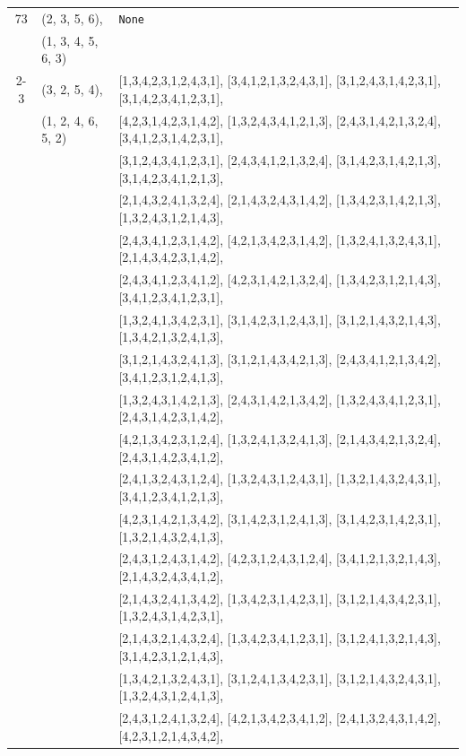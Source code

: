 \documentclass[10pt]{amsart}
\numberwithin{equation}{section}
\theoremstyle{plain}
\theoremstyle{definition}
\theoremstyle{remark}
\begin{document}
{\begin{longtable}{c|l|l}
		73 & (2, 3, 5, 6), & \texttt{None} \\
		& (1, 3, 4, 5, 6, 3) &  \\ \cline{2-3}
		
		& (3, 2, 5, 4), & [1,3,4,2,3,1,2,4,3,1], [3,4,1,2,1,3,2,4,3,1], [3,1,2,4,3,1,4,2,3,1], [3,1,4,2,3,4,1,2,3,1], \\
		& (1, 2, 4, 6, 5, 2) & [4,2,3,1,4,2,3,1,4,2], [1,3,2,4,3,4,1,2,1,3], [2,4,3,1,4,2,1,3,2,4], [3,4,1,2,3,1,4,2,3,1], \\
		&  & [3,1,2,4,3,4,1,2,3,1], [2,4,3,4,1,2,1,3,2,4], [3,1,4,2,3,1,4,2,1,3], [3,1,4,2,3,4,1,2,1,3], \\
		&  & [2,1,4,3,2,4,1,3,2,4], [2,1,4,3,2,4,3,1,4,2], [1,3,4,2,3,1,4,2,1,3], [1,3,2,4,3,1,2,1,4,3], \\
		&  & [2,4,3,4,1,2,3,1,4,2], [4,2,1,3,4,2,3,1,4,2], [1,3,2,4,1,3,2,4,3,1], [2,1,4,3,4,2,3,1,4,2], \\
		&  & [2,4,3,4,1,2,3,4,1,2], [4,2,3,1,4,2,1,3,2,4], [1,3,4,2,3,1,2,1,4,3], [3,4,1,2,3,4,1,2,3,1], \\
		&  & [1,3,2,4,1,3,4,2,3,1], [3,1,4,2,3,1,2,4,3,1], [3,1,2,1,4,3,2,1,4,3], [1,3,4,2,1,3,2,4,1,3], \\
		&  & [3,1,2,1,4,3,2,4,1,3], [3,1,2,1,4,3,4,2,1,3], [2,4,3,4,1,2,1,3,4,2], [3,4,1,2,3,1,2,4,1,3], \\
		&  & [1,3,2,4,3,1,4,2,1,3], [2,4,3,1,4,2,1,3,4,2], [1,3,2,4,3,4,1,2,3,1], [2,4,3,1,4,2,3,1,4,2], \\
		&  & [4,2,1,3,4,2,3,1,2,4], [1,3,2,4,1,3,2,4,1,3], [2,1,4,3,4,2,1,3,2,4], [2,4,3,1,4,2,3,4,1,2], \\
		&  & [2,4,1,3,2,4,3,1,2,4], [1,3,2,4,3,1,2,4,3,1], [1,3,2,1,4,3,2,4,3,1], [3,4,1,2,3,4,1,2,1,3], \\
		&  & [4,2,3,1,4,2,1,3,4,2], [3,1,4,2,3,1,2,4,1,3], [3,1,4,2,3,1,4,2,3,1], [1,3,2,1,4,3,2,4,1,3], \\
		&  & [2,4,3,1,2,4,3,1,4,2], [4,2,3,1,2,4,3,1,2,4], [3,4,1,2,1,3,2,1,4,3], [2,1,4,3,2,4,3,4,1,2], \\
		&  & [2,1,4,3,2,4,1,3,4,2], [1,3,4,2,3,1,4,2,3,1], [3,1,2,1,4,3,4,2,3,1], [1,3,2,4,3,1,4,2,3,1], \\
		&  & [2,1,4,3,2,1,4,3,2,4], [1,3,4,2,3,4,1,2,3,1], [3,1,2,4,1,3,2,1,4,3], [3,1,4,2,3,1,2,1,4,3], \\
		&  & [1,3,4,2,1,3,2,4,3,1], [3,1,2,4,1,3,4,2,3,1], [3,1,2,1,4,3,2,4,3,1], [1,3,2,4,3,1,2,4,1,3], \\
		&  & [2,4,3,1,2,4,1,3,2,4], [4,2,1,3,4,2,3,4,1,2], [2,4,1,3,2,4,3,1,4,2], [4,2,3,1,2,1,4,3,4,2], \\

\end{longtable}}
\end{document}
